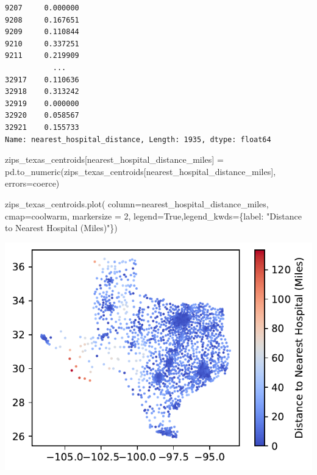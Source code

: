 \documentclass[
  letterpaper,
  DIV=11,
  numbers=noendperiod]{scrartcl}
\newenvironment{Shaded}{\begin{snugshade}}{\end{snugshade}}
\newcommand{\DecValTok}[1]{\textcolor[rgb]{0.68,0.00,0.00}{#1}}
\newcommand{\NormalTok}[1]{\textcolor[rgb]{0.00,0.23,0.31}{#1}}
\newcommand{\OperatorTok}[1]{\textcolor[rgb]{0.37,0.37,0.37}{#1}}
\newcommand{\StringTok}[1]{\textcolor[rgb]{0.13,0.47,0.30}{#1}}
\newcommand{\VariableTok}[1]{\textcolor[rgb]{0.07,0.07,0.07}{#1}}
\begin{document}
\begin{verbatim}
9207     0.000000
9208     0.167651
9209     0.110844
9210     0.337251
9211     0.219909
           ...   
32917    0.110636
32918    0.313242
32919    0.000000
32920    0.058567
32921    0.155733
Name: nearest_hospital_distance, Length: 1935, dtype: float64
\end{verbatim}

\begin{Shaded}
\begin{Highlighting}[]
\NormalTok{zips\_texas\_centroids[}\StringTok{\textquotesingle{}nearest\_hospital\_distance\_miles\textquotesingle{}}\NormalTok{] }\OperatorTok{=}\NormalTok{ pd.to\_numeric(zips\_texas\_centroids[}\StringTok{\textquotesingle{}nearest\_hospital\_distance\_miles\textquotesingle{}}\NormalTok{], errors}\OperatorTok{=}\StringTok{\textquotesingle{}coerce\textquotesingle{}}\NormalTok{)}

\NormalTok{zips\_texas\_centroids.plot(}
\NormalTok{    column}\OperatorTok{=}\StringTok{\textquotesingle{}nearest\_hospital\_distance\_miles\textquotesingle{}}\NormalTok{, }
\NormalTok{    cmap}\OperatorTok{=}\StringTok{\textquotesingle{}coolwarm\textquotesingle{}}\NormalTok{, markersize }\OperatorTok{=} \DecValTok{2}\NormalTok{,}
\NormalTok{    legend}\OperatorTok{=}\VariableTok{True}\NormalTok{,legend\_kwds}\OperatorTok{=}\NormalTok{\{}\StringTok{\textquotesingle{}label\textquotesingle{}}\NormalTok{: }\StringTok{"Distance to Nearest Hospital (Miles)"}\NormalTok{\})}
\end{Highlighting}
\end{Shaded}

\includegraphics{ps4_files/figure-pdf/cell-31-output-1.pdf}
\end{document}
